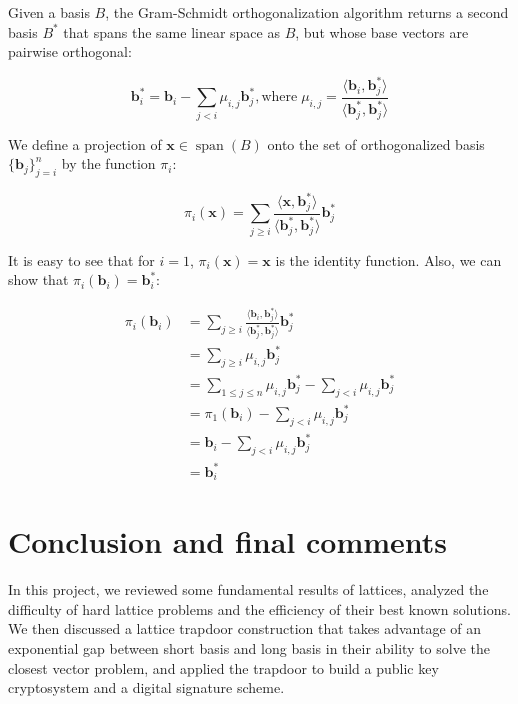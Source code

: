 \documentclass[letterpaper,12pt]{article}
\begin{document}
Given a basis $B$, the Gram-Schmidt orthogonalization algorithm returns a second basis $B^\ast$ that spans the same linear space as $B$, but whose base vectors are pairwise orthogonal:

$$
\mathbf{b}_i^\ast = \mathbf{b}_i - \sum_{j<i}\mu_{i, j}\mathbf{b}_j^\ast,
\text{where} \; \mu_{i, j} = \frac{
    \langle \mathbf{b}_i, \mathbf{b}_j^\ast\rangle
}{\langle \mathbf{b}_j^\ast, \mathbf{b}_j^\ast\rangle}
$$

We define a projection of $\mathbf{x} \in \operatorname{span}(B)$ onto the set of orthogonalized basis $\{\mathbf{b}_j\}_{j=i}^n$ by the function $\pi_i$:

$$
\pi_i(\mathbf{x}) = \sum_{j \geq i} \frac{
    \langle \mathbf{x}, \mathbf{b}_j^\ast\rangle
}{
    \langle \mathbf{b}_j^\ast, \mathbf{b}_j^\ast \rangle
} \mathbf{b}_j^\ast
$$

It is easy to see that for $i = 1$, $\pi_i(\mathbf{x}) = \mathbf{x}$ is the identity function. Also, we can show that $\pi_i(\mathbf{b}_i) = \mathbf{b}_i^\ast$:

$$
\begin{aligned}
\pi_i(\mathbf{b}_i) 
&= \sum_{j\geq i}\frac{\langle \mathbf{b}_i, \mathbf{b}_j^\ast\rangle}{\langle \mathbf{b}_j^\ast, \mathbf{b}_j^\ast \rangle}\mathbf{b}_j^\ast \\
&= \sum_{j\geq i}\mu_{i, j}\mathbf{b}_j^\ast \\
&= \sum_{1 \leq j \leq n}\mu_{i, j}\mathbf{b}_j^\ast  - \sum_{j < i}\mu_{i, j}\mathbf{b}_j^\ast \\
&= \pi_1(\mathbf{b}_i) - \sum_{j < i}\mu_{i, j}\mathbf{b}_j^\ast \\
&= \mathbf{b}_i - \sum_{j < i}\mu_{i, j}\mathbf{b}_j^\ast \\
&= \mathbf{b}_i^\ast
\end{aligned}
$$

% 




\section{Conclusion and final comments}
In this project, we reviewed some fundamental results of lattices, analyzed the difficulty of hard lattice problems and the efficiency of their best known solutions. We then discussed a lattice trapdoor construction that takes advantage of an exponential gap between short basis and long basis in their ability to solve the closest vector problem, and applied the trapdoor to build a public key cryptosystem and a digital signature scheme.
\end{document}
